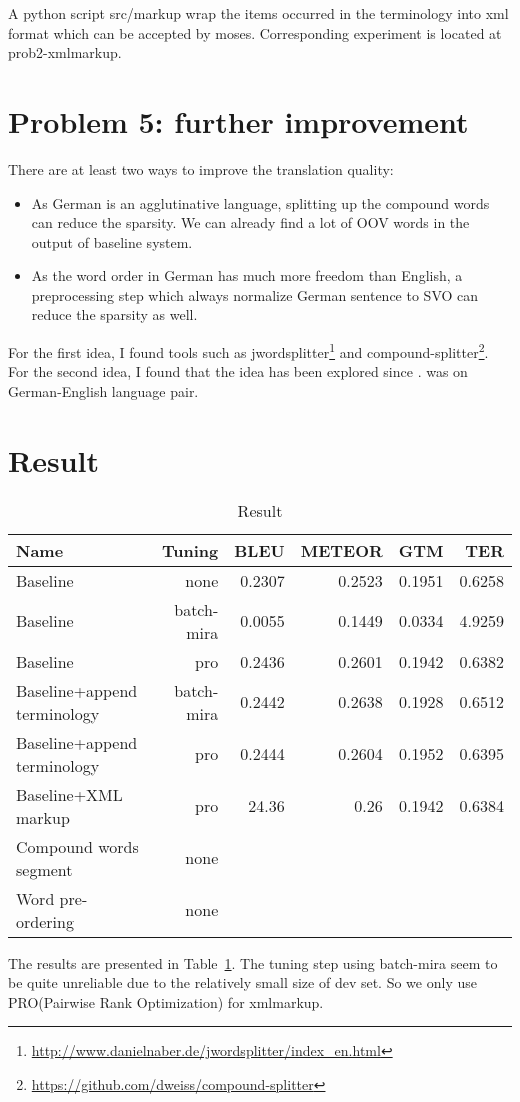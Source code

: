 \documentclass[a4paper]{article}
\begin{document}
A python script src/markup wrap the items occurred in the terminology into xml format which can be accepted by moses.
Corresponding experiment is located at prob2-xmlmarkup.




\section{Problem 5: further improvement}
There are at least two ways to improve the translation quality:
\begin{itemize}
    \item As German is an agglutinative language, splitting up the compound words can reduce the sparsity. We can already find a lot of OOV words in the output of baseline system.
    \item As the word order in German has much more freedom than English, a preprocessing step which always normalize German sentence to SVO can reduce the sparsity as well.
\end{itemize}
For the first idea, I found tools such as jwordsplitter\footnote{\url{http://www.danielnaber.de/jwordsplitter/index_en.html}} and compound-splitter\footnote{\url{https://github.com/dweiss/compound-splitter}}. 
For the second idea, I found that the idea has been explored since \citet{xia2004improving}. \citet{collins2005clause} was on German-English language pair.


\section{Result}
\begin{table}
    \centering
    \begin{tabular}{l|r|r|r|r|r}
        \hline
        Name & Tuning & BLEU & METEOR & GTM & TER \\
        \hline
        Baseline & none& 0.2307 & 0.2523 & 0.1951 & 0.6258 \\
        Baseline & batch-mira & 0.0055 & 0.1449  & 0.0334 & 4.9259 \\
        Baseline & pro & 0.2436 & 0.2601 & 0.1942& 0.6382 \\
        Baseline+append terminology & batch-mira & 0.2442 & 0.2638 & 0.1928 & 0.6512 \\
        Baseline+append terminology & pro & 0.2444 & 0.2604 & 0.1952 & 0.6395 \\
        Baseline+XML markup & pro & 24.36 & 0.26 &  0.1942 & 0.6384\\
        Compound words segment & none & & & &\\
        Word pre-ordering & none & & & &\\
        \hline
    \end{tabular}
    \caption{Result}
    \label{tab:result}
\end{table}

The results are presented in Table~\ref{tab:result}. 
The tuning step using batch-mira seem to be quite unreliable due to the relatively small size of dev set.
So we only use PRO(Pairwise Rank Optimization) for xmlmarkup.

\printbibliography
\end{document}
